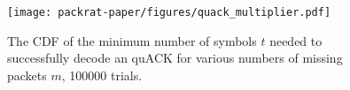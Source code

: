 \begin{figure}[t]
    \centering
    \texttt{[image: packrat-paper/figures/quack\_multiplier.pdf]}
    \caption{The CDF of the minimum number of symbols $t$ needed to successfully
    decode an quACK for various numbers of missing packets $m$, 100000 trials.}
    \label{fig:iblt-quack}
\end{figure}
